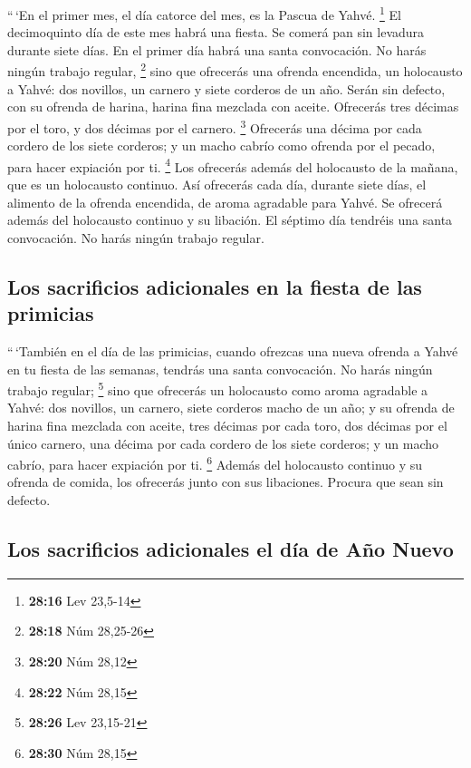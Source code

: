  ``\,`En el primer mes, el día catorce del mes, es la
Pascua de Yahvé. \footnote{\textbf{28:16} Lev 23,5-14} 
El decimoquinto día de este mes habrá una fiesta. Se comerá pan sin
levadura durante siete días.  En el primer día habrá una
santa convocación. No harás ningún trabajo regular, \footnote{\textbf{28:18}
  Núm 28,25-26}  sino que ofrecerás una ofrenda
encendida, un holocausto a Yahvé: dos novillos, un carnero y siete
corderos de un año. Serán sin defecto,  con su ofrenda de
harina, harina fina mezclada con aceite. Ofrecerás tres décimas por el
toro, y dos décimas por el carnero. \footnote{\textbf{28:20} Núm 28,12}
 Ofrecerás una décima por cada cordero de los siete
corderos;  y un macho cabrío como ofrenda por el pecado,
para hacer expiación por ti. \footnote{\textbf{28:22} Núm 28,15}
 Los ofrecerás además del holocausto de la mañana, que es
un holocausto continuo.  Así ofrecerás cada día, durante
siete días, el alimento de la ofrenda encendida, de aroma agradable para
Yahvé. Se ofrecerá además del holocausto continuo y su libación.
 El séptimo día tendréis una santa convocación. No harás
ningún trabajo regular.

\hypertarget{los-sacrificios-adicionales-en-la-fiesta-de-las-primicias}{%
\subsection{Los sacrificios adicionales en la fiesta de las
primicias}\label{los-sacrificios-adicionales-en-la-fiesta-de-las-primicias}}

 ``\,`También en el día de las primicias, cuando ofrezcas
una nueva ofrenda a Yahvé en tu fiesta de las semanas, tendrás una santa
convocación. No harás ningún trabajo regular; \footnote{\textbf{28:26}
  Lev 23,15-21}  sino que ofrecerás un holocausto como
aroma agradable a Yahvé: dos novillos, un carnero, siete corderos macho
de un año;  y su ofrenda de harina fina mezclada con
aceite, tres décimas por cada toro, dos décimas por el único carnero,
 una décima por cada cordero de los siete corderos;
 y un macho cabrío, para hacer expiación por ti.
\footnote{\textbf{28:30} Núm 28,15}  Además del
holocausto continuo y su ofrenda de comida, los ofrecerás junto con sus
libaciones. Procura que sean sin defecto.

\hypertarget{los-sacrificios-adicionales-el-duxeda-de-auxf1o-nuevo}{%
\subsection{Los sacrificios adicionales el día de Año
Nuevo}\label{los-sacrificios-adicionales-el-duxeda-de-auxf1o-nuevo}}

